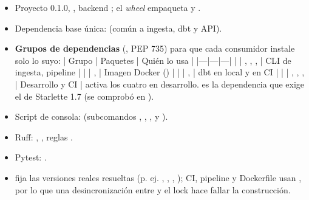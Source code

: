 \begin{itemize}
\item Proyecto  0.1.0, , backend ; el \emph{wheel} empaqueta  y .
\item Dependencia base única:  (común a ingesta, dbt y API).
\item \textbf{Grupos de dependencias} (, PEP 735) para que cada consumidor instale solo lo suyo: | Grupo | Paquetes | Quién lo usa | |---|---|---| |  | , , ,  | CLI de ingesta, pipeline | |  | ,  | Imagen Docker () | |  | ,  | dbt en local y en CI | |  | , , ,  | Desarrollo y CI |  activa los cuatro en desarrollo.  es la dependencia que exige el  de Starlette 1.7 (se comprobó en ).
\item Script de consola:  (subcomandos , , ,  y ).
\item Ruff: , , reglas .
\item Pytest: .
\item {} fija las versiones reales resueltas (p. ej. , , , ); CI, pipeline y Dockerfile usan , por lo que una desincronización entre  y el lock hace fallar la construcción.
\end{itemize}


